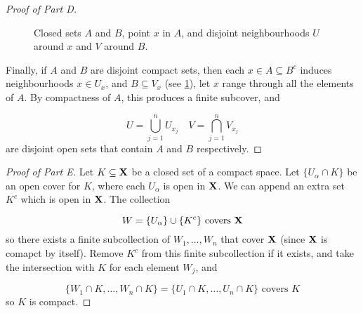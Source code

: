 \documentclass[../main-manifolds.tex]{subfiles}
\begin{document}
\begin{proof}[Proof of  Part D]
\begin{figure}[htbp]
    \centering
    \caption{Closed sets $A$ and $B$, point $x$ in $A$, and disjoint neighbourhoods $U$ around $x$ and $V$ around $B$.}
    \label{lee-appendix-A.45D-closed-sets-separation}
\end{figure}

Finally, if $A$ and $B$ are disjoint compact sets, then each $x\in A\subseteq B^c$ induces neighbourhoods $x\in U_x$, and $B\subseteq V_x$ (see \cref{lee-appendix-A.45D-closed-sets-separation}), let $x$ range through all the elements of $A$. By compactness of $A$, this produces a finite subcover, and 

\[
    U = \bigcup_{j=1}^n U_{x_j}\quad V=\bigcap_{j=1}^n V_{x_j}
\]
are disjoint open sets that contain $A$ and $B$ respectively.





\end{proof}

\newpage

\begin{proof}[Proof of  Part E]
    Let $K\subseteq {\mathbf{X}}$ be a closed set of a compact space. Let $\{U_\alpha\cap K\}$ be an open cover for $K$, where each $U_\alpha$ is open in ${\mathbf{X}}$. We can append an extra set $K^c$ which is open in ${\mathbf{X}}$. The collection

    \[
        W = \{U_\alpha\}\cup \{K^c\} \text{ covers }{\mathbf{X}}
    \]
    so there exists a finite subcollection of $W_1,\ldots, W_n$ that cover ${\mathbf{X}}$ (since ${\mathbf{X}}$ is comapct by itself). Remove $K^c$ from this finite subcollection if it exists, and take the intersection with $K$ for each element $W_j$, and

    \[
        \{W_1\cap K,\ldots, W_n\cap K\} = \{U_1\cap K,\ldots, U_n\cap K\}\text{ covers }K
    \]
    so $K$ is compact.
\end{proof}
    
\end{document}
